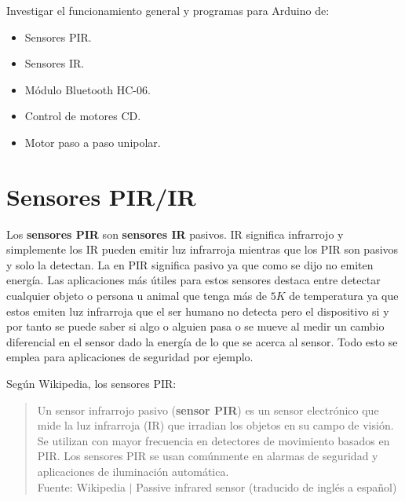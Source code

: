 \documentclass[conference]{IEEEtran}
\begin{document}
    Investigar el funcionamiento general y programas para Arduino de:

    \begin{itemize}
        \item Sensores PIR.
        \item Sensores IR.
        \item Módulo Bluetooth HC-06.
        \item Control de motores CD.
        \item Motor paso a paso unipolar.
    \end{itemize}

    \section{Sensores PIR/IR}

    Los \textbf{sensores PIR} son \textbf{sensores IR} pasivos. IR significa infrarrojo y simplemente los IR pueden emitir luz infrarroja mientras que los PIR son pasivos y solo la detectan. La  en PIR significa pasivo ya que como se dijo no emiten energía. Las aplicaciones más útiles para estos sensores destaca entre detectar cualquier objeto o persona u animal que tenga más de $5K$ de temperatura ya que estos emiten luz infrarroja que el ser humano no detecta pero el dispositivo si \cite{jost-ir-sensor-2019} y por tanto se puede saber si algo o alguien pasa o se mueve al medir un cambio diferencial en el sensor dado la energía de lo que se acerca al sensor. Todo esto se emplea para aplicaciones de seguridad por ejemplo.

    \bigbreak

    Según Wikipedia, los sensores PIR:

    \begin{quote}
        Un sensor infrarrojo pasivo (\textbf{sensor PIR}) es un sensor electrónico que mide la luz infrarroja (IR) que irradian los objetos en su campo de visión. Se utilizan con mayor frecuencia en detectores de movimiento basados en PIR. Los sensores PIR se usan comúnmente en alarmas de seguridad y aplicaciones de iluminación automática.\\
        \small Fuente: Wikipedia $\mid$ Passive infrared sensor (traducido de inglés a español) \cite{wikipedia-pir-sensor-2022}
    \end{quote}
\end{document}
